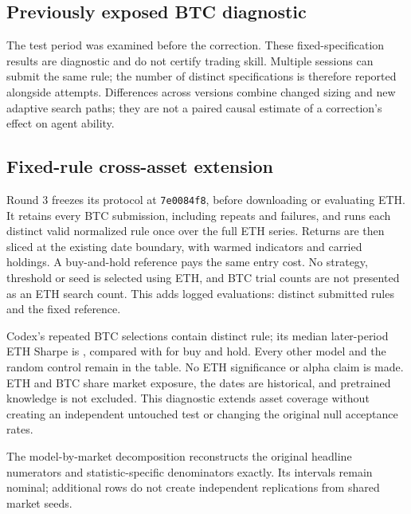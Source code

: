 \documentclass[11pt]{article}
\begin{document}
\subsection{Previously exposed BTC diagnostic}

The test period was examined before the correction. These fixed-specification
results are diagnostic and do not certify trading skill. Multiple sessions can
submit the same rule; the number of distinct specifications is therefore reported
alongside attempts. Differences across versions combine changed sizing and new
adaptive search paths; they are not a paired causal estimate of a correction's
effect on agent ability.

\subsection{Fixed-rule cross-asset extension}
Round 3 freezes its protocol at \texttt{7e0084f8}, before downloading or evaluating
ETH. It retains every BTC submission, including repeats and failures, and runs
each distinct valid normalized rule once over the full ETH series. Returns are
then sliced at the existing date boundary, with warmed indicators and carried
holdings. A buy-and-hold reference pays the same entry cost. No strategy,
threshold or seed is selected using ETH, and BTC trial counts are not presented
as an ETH search count. This adds \EthEvaluations{} logged evaluations:
\EthRules{} distinct submitted rules and the fixed reference.

Codex's repeated BTC selections contain \EthCodexRules{} distinct rule; its
median later-period ETH Sharpe is \EthCodexLater{}, compared with
\EthReferenceLater{} for buy and hold. Every other model and the random control
remain in the table. No ETH significance or alpha claim is made. ETH and BTC
share market exposure, the dates are historical, and pretrained knowledge is
not excluded. This diagnostic extends asset coverage without creating an
independent untouched test or changing the original null acceptance rates.


The model-by-market decomposition reconstructs the original headline numerators
and statistic-specific denominators exactly. Its intervals remain nominal;
additional rows do not create independent replications from shared market seeds.
\end{document}
